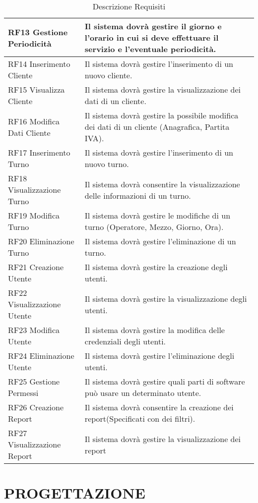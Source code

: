 \documentclass[green, fancy, 11pt]{elegantbook}
\begin{document}
{\begin{table}[H]
\begin{tabular}{|p{5cm}|p{11cm}|}
	\hline
	RF13 Gestione Periodicità & Il sistema dovrà gestire il giorno e l'orario in cui si deve effettuare il servizio e l'eventuale periodicità.\\
	\hline
	RF14 Inserimento Cliente & Il sistema dovrà gestire l'inserimento di un nuovo cliente.\\
	\hline
	RF15 Visualizza Cliente & Il sistema dovrà gestire la visualizzazione dei dati di un cliente.\\
	\hline
	RF16 Modifica Dati Cliente & Il sistema dovrà gestire la possibile modifica dei dati di un cliente (Anagrafica, Partita IVA).\\
	\hline
	RF17 Inserimento Turno & Il sistema dovrà gestire l'inserimento di un nuovo turno.\\
	\hline
	RF18 Visualizzazione Turno & Il sistema dovrà consentire la visualizzazione delle informazioni di un turno.\\
	\hline
	RF19 Modifica Turno & Il sistema dovrà gestire le modifiche di un turno (Operatore, Mezzo, Giorno, Ora).\\
	\hline
	RF20 Eliminazione Turno& Il sistema dovrà gestire l'eliminazione di un turno.\\
	\hline
	RF21 Creazione Utente& Il sistema dovrà gestire la creazione degli utenti.\\
	\hline
	RF22 Visualizzazione Utente& Il sistema dovrà gestire la visualizzazione degli utenti.\\
	\hline
	RF23 Modifica Utente& Il sistema dovrà gestire la modifica delle credenziali degli utenti.\\
	\hline
	RF24 Eliminazione Utente& Il sistema dovrà gestire l'eliminazione degli utenti.\\
	\hline
	RF25 Gestione Permessi&Il sistema dovrà gestire quali parti di software può usare un determinato utente.\\
	\hline
	RF26 Creazione Report&Il sistema dovrà consentire la creazione dei report(Specificati con dei filtri).\\
	\hline
	RF27 Visualizzazione Report&Il sistema dovrà gestire la visualizzazione dei report\\
	\hline
\end{tabular}
	\caption{Descrizione Requisiti}
\end{table}
}
\chapter{PROGETTAZIONE}
\end{document}
